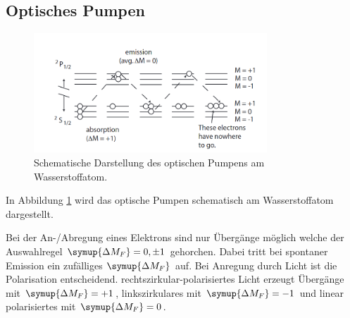 \subsection{Optisches Pumpen}
\begin{figure}
    \centering
    \includegraphics[width = 0.78\textwidth]{pics/pumpen.png}
    \caption{Schematische Darstellung des optischen Pumpens am Wasserstoffatom.\cite{op}}
    \label{pic:pump}
\end{figure}
In Abbildung \ref{pic:pump} wird das optische Pumpen schematisch am Wasserstoffatom dargestellt.

Bei der An-/Abregung eines Elektrons sind nur Übergänge möglich welche der Auswahlregel $\symup{\Delta{M_F}} = 0, \pm 1$ gehorchen.
Dabei tritt bei spontaner Emission ein zufälliges $\symup{\Delta{M_F}}$ auf. Bei Anregung durch Licht ist die Polarisation entscheidend.
rechtszirkular-polarisiertes Licht erzeugt Übergänge mit $\symup{\Delta{M_F}} = +1$, linkszirkulares mit $\symup{\Delta{M_F}} = -1$ und linear polarisiertes
mit $\symup{\Delta{M_F}} = 0$.

